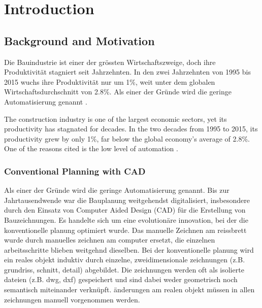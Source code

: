 \chapter{Introduction}
\label{sec:introduction}

\section{Background and Motivation}
\begin{German}
    Die Bauindustrie ist einer der grössten Wirtschaftszweige, doch ihre Produktivität stagniert seit Jahrzehnten. In den zwei Jahrzehnten von 1995 bis 2015 wuchs ihre Produktivität nur um 1\%, weit unter dem globalen Wirtschaftsdurchschnitt von 2.8\%. Als einer der Gründe wird die geringe Automatisierung genannt \cite{barbosaReinventingConstructionRoute2017}.
\end{German}
\begin{English}
    The construction industry is one of the largest economic sectors, yet its productivity has stagnated for decades. In the two decades from 1995 to 2015, its productivity grew by only 1\%, far below the global economy's average of 2.8\%. One of the reasons cited is the low level of automation \cite{barbosaReinventingConstructionRoute2017}.
\end{English}

\subsection{Conventional Planning with CAD}
\begin{German}
    Als einer der Gründe wird die geringe Automatisierung genannt. Bis zur Jahrtausendwende war die Bauplanung weitgehendst digitalisiert, insbesondere durch den Einsatz von Computer Aided Design (CAD) für die Erstellung von Bauzeichnungen. Es handelte sich um eine evolutionäre innovation, bei der die konventionelle planung optimiert wurde. Das manuelle Zeichnen am reissbrett wurde durch manuelles zeichnen am computer ersetzt, die einzelnen arbeitsschritte blieben weitgehnd dieselben. Bei der konventionelle planung wird ein reales objekt induktiv durch einzelne, zweidimensionale zeichnungen (z.B. grundriss, schnitt, detail) abgebildet. Die zeichnungen werden oft als isolierte dateien (z.B. dwg, dxf) gespeichert und sind dabei weder geometrisch noch semantisch miteinander verknüpft. änderungen am realen objekt müssen in allen zeichnungen manuell vorgenommen werden. \\
\end{German}

